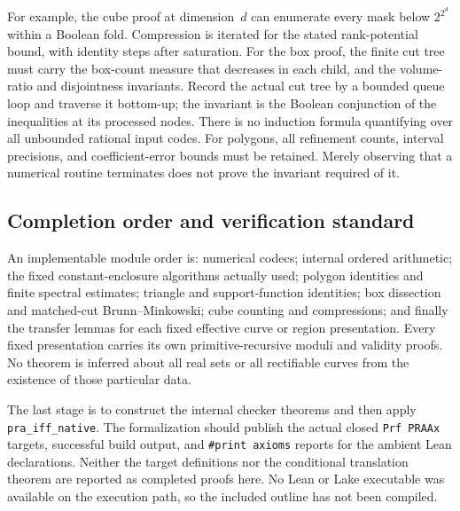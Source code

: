 For example, the cube proof at dimension~$d$ can enumerate every mask below
$2^{2^d}$ within a Boolean fold.  Compression is iterated for the stated
rank-potential bound, with identity steps after saturation.  For the box
proof, the finite cut tree must carry the box-count measure that decreases
in each child, and the volume-ratio and disjointness invariants.  Record the
actual cut tree by a bounded queue loop and traverse it bottom-up; the
invariant is the Boolean conjunction of the inequalities at its processed
nodes.  There is no induction formula quantifying over all unbounded
rational input codes.  For polygons, all refinement
counts, interval precisions, and coefficient-error bounds must be retained.
Merely observing that a numerical routine terminates does not prove the
invariant required of it.

\subsection{Completion order and verification standard}

An implementable module order is: numerical codecs; internal ordered
arithmetic; the fixed constant-enclosure algorithms actually used; polygon
identities and finite spectral estimates; triangle and support-function
identities; box dissection and matched-cut Brunn--Minkowski; cube counting
and compressions; and finally the transfer lemmas for each fixed effective
curve or region presentation.  Every fixed presentation carries its own
primitive-recursive moduli and validity proofs.  No theorem is inferred
about all real sets or all rectifiable curves from the existence of those
particular data.

The last stage is to construct the internal checker theorems and then apply
\texttt{pra\_iff\_native}.  The formalization should publish the actual
closed \texttt{Prf PRAAx} targets, successful build output, and
\texttt{\#print axioms} reports for the ambient Lean declarations.  Neither
the target definitions nor the conditional translation theorem are reported
as completed proofs here.  No Lean or Lake executable was available on the
execution path, so the included outline has not been compiled.
